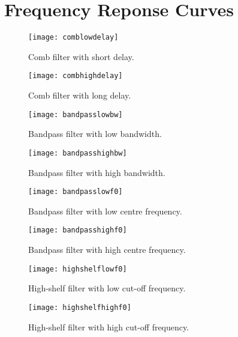 \chapter{Frequency Reponse Curves}\label{app:frequencyresponse}

\begin{figure}[!h] 
\centering
\texttt{[image: comblowdelay]}
\caption{\label{fig:comblowdelay} Comb filter with short delay.}
\end{figure}

\begin{figure}[!h] 
\centering
\texttt{[image: combhighdelay]}
\caption{\label{fig:combhighdelay} Comb filter with long delay.}
\end{figure}

\begin{figure}[!h] 
\centering
\texttt{[image: bandpasslowbw]}
\caption{\label{fig:bandpasslowbw} Bandpass filter with low bandwidth.}
\end{figure}

\begin{figure}[!h] 
\centering
\texttt{[image: bandpasshighbw]}
\caption{\label{fig:bandpasshighbw} Bandpass filter with high bandwidth.}
\end{figure}

\begin{figure}[!h] 
\centering
\texttt{[image: bandpasslowf0]}
\caption{\label{fig:bandpasslowf0} Bandpass filter with low centre frequency.}
\end{figure}

\begin{figure}[!h] 
\centering
\texttt{[image: bandpasshighf0]}
\caption{\label{fig:bandpasshighf0} Bandpass filter with high centre frequency.}
\end{figure}

\begin{figure}[!h] 
\centering
\texttt{[image: highshelflowf0]}
\caption{\label{fig:highshelflowf0} High-shelf filter with low cut-off frequency.}
\end{figure}

\begin{figure}[!h] 
\centering
\texttt{[image: highshelfhighf0]}
\caption{\label{fig:highshelhighf0} High-shelf filter with high cut-off frequency.}
\end{figure}

